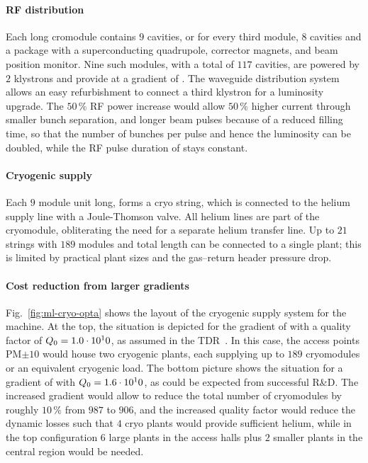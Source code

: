 \paragraph{RF distribution}

Each  long cromodule contains $9$ cavities, or for every third module, $8$ cavities and a package with a superconducting quadrupole, corrector magnets, and beam position monitor.
Nine such modules, with a total of $117$ cavities, are powered by $2$ klystrons and provide  at a gradient of .
The waveguide distribution system allows an easy refurbishment to connect a third klystron for a luminosity upgrade.
The $50\,\%$ RF power increase would allow $50\,\%$ higher current through smaller bunch separation, and longer beam pulses because of a reduced filling time, so that the number of bunches per pulse and hence the luminosity can be doubled, while the RF pulse duration of  stays constant.

\paragraph{Cryogenic supply}


Each $9$ module unit  long, forms a cryo string, which is connected to the helium supply line with a Joule-Thomson valve.
All helium lines are part of the cryomodule, obliterating the need for a separate helium transfer line. 
Up to $21$ strings with $189$ modules and  total length can be connected to a single plant; 
this is limited by practical plant sizes and the gas--return header pressure drop.  


\paragraph{Cost reduction from larger gradients}

Fig.~\ref{fig:ml-cryo-opta} shows the layout of the cryogenic supply system for the  machine.
At the top, the situation is depicted for the gradient of  with a quality factor of $Q_{\mathrm{0}}=1.0\cdot 10^10$, as assumed in the TDR~\cite{Adolphsen:2013kya}. 
In this case, the access points PM$\pm 10$ would house two cryogenic plants, each supplying up to $189$ cryomodules or an equivalent cryogenic load.
The bottom picture shows the situation for a gradient of  with $Q_{\mathrm{0}}=1.6\cdot 10^10$, as could be expected from successful R\&D. 
The increased gradient would  allow to reduce the total number of cryomodules by roughly $10\,\%$ from $987$ to $906$, and the increased quality factor would reduce the dynamic losses such that $4$ cryo plants would provide sufficient helium, while in the top configuration $6$ large plants in the access halls plus $2$ smaller plants in the central region would be needed.

